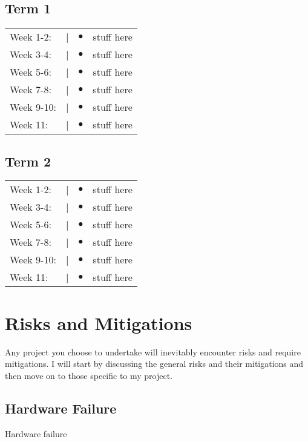 \documentclass[12pt]{article}
\begin{document}
\subsection{Term 1}
\begin{tabular}{@{}p{2cm}@{}>{\raggedright\arraybackslash}p{0.5cm}@{}>{\raggedright\arraybackslash}p{0.5cm}@{}p{12cm}}
Week 1-2: & \textcolor{black}{|} & $\bullet$ & stuff here \\
Week 3-4: & \textcolor{black}{|} & $\bullet$ & stuff here \\
Week 5-6: & \textcolor{black}{|} & $\bullet$ & stuff here \\
Week 7-8: & \textcolor{black}{|} & $\bullet$ & stuff here \\
Week 9-10: & \textcolor{black}{|} & $\bullet$ & stuff here \\
Week 11: & \textcolor{black}{|} & $\bullet$ & stuff here \\
\end{tabular}

\subsection{Term 2}
\begin{tabular}{@{}p{2cm}@{}>{\raggedright\arraybackslash}p{0.5cm}@{}>{\raggedright\arraybackslash}p{0.5cm}@{}p{12cm}}
Week 1-2: & \textcolor{black}{|} & $\bullet$ & stuff here \\
Week 3-4: & \textcolor{black}{|} & $\bullet$ & stuff here \\
Week 5-6: & \textcolor{black}{|} & $\bullet$ & stuff here \\
Week 7-8: & \textcolor{black}{|} & $\bullet$ & stuff here \\
Week 9-10: & \textcolor{black}{|} & $\bullet$ & stuff here \\
Week 11: & \textcolor{black}{|} & $\bullet$ & stuff here \\
\end{tabular}


\section{Risks and Mitigations}
Any project you choose to undertake will inevitably encounter risks and require mitigations. I will start by discussing the general risks and their mitigations and then move on to those specific to my project.

\subsection{Hardware Failure}
Hardware failure
\end{document}
